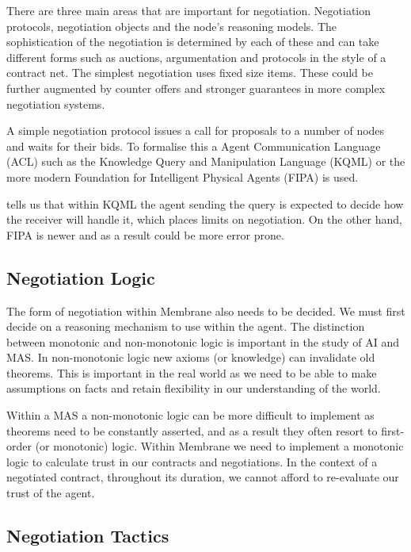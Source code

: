 \documentclass[11pt, a4paper, twoside]{report}
\begin{document}
There are three main areas that are important for negotiation. Negotiation protocols, negotiation objects and the node's reasoning models. \citep{beer1999negotiation} The sophistication of the negotiation is determined by each of these and can take different forms such as auctions, argumentation and protocols in the style of a contract net. The simplest negotiation uses fixed size items. These could be further augmented by counter offers and stronger guarantees in more complex negotiation systems.

A simple negotiation protocol issues a call for proposals to a number of nodes and waits for their bids. To formalise this a Agent Communication Language (ACL) such as the Knowledge Query and Manipulation Language (KQML) \citep{finin1992specification} or the more modern Foundation for Intelligent Physical Agents (FIPA) \citep{fipa2002fipa} is used.

\citep{rahwan2005interest} \cite{beer1999negotiation} tells us that within KQML the agent sending the query is expected to decide how the receiver will handle it, which places limits on negotiation. On the other hand, FIPA is newer and as a result could be more error prone.

\subsection{Negotiation Logic}

The form of negotiation within Membrane also needs to be decided. We must first decide on a reasoning mechanism to use within the agent. The distinction between monotonic and non-monotonic logic is important in the study of AI and MAS. In non-monotonic logic new axioms (or knowledge) can invalidate old theorems. \citep*{mcdermott1980non, antonelli2008non} This is important in the real world as we need to be able to make assumptions on facts and retain flexibility in our understanding of the world.

Within a MAS a non-monotonic logic can be more difficult to implement as theorems need to be constantly asserted, and as a result they often resort to first-order (or monotonic) logic. Within Membrane we need to implement a monotonic logic to calculate trust in our contracts and negotiations. In the context of a negotiated contract, throughout its duration, we cannot afford to re-evaluate our trust of the agent.

\subsection{Negotiation Tactics}
\end{document}
